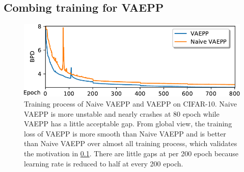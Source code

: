 \subsection{Combing training for VAEPP} \label{subsec:improve_of_vaepp}

\begin{figure}[tb]
	\centering
	\includegraphics[width=0.9\columnwidth]{../dist.strip/loss_curves}
	\caption{
	Training process of Naive VAEPP and VAEPP on CIFAR-10. Naive VAEPP is more unstable and nearly crashes at 80 epoch while VAEPP has a little acceptable gap. From global view, the training loss of VAEPP is more smooth than Naive VAEPP and is better than Naive VAEPP over almost all training process, which validates the motivation in \cref{subsec:improve_of_vaepp}. There are little gaps at per 200 epoch because learning rate is reduced to half at every 200 epoch. 
	}
	\label{fig:loss_curves}
\end{figure}


